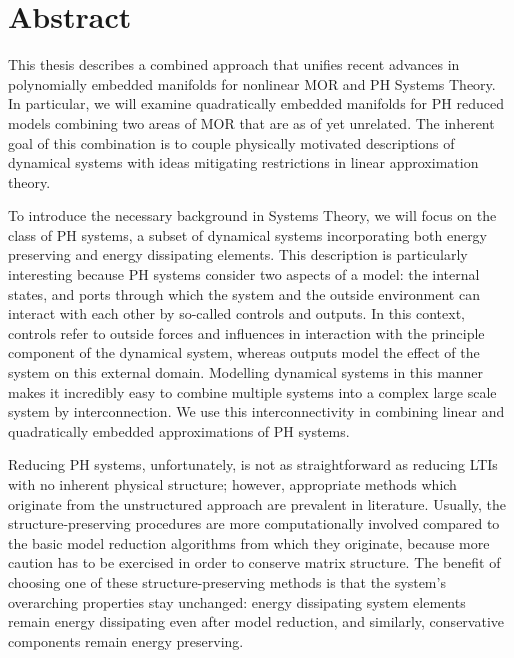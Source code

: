 \chapter*{Abstract}

This thesis describes a combined approach that unifies recent advances in polynomially embedded manifolds for nonlinear \acl{MOR} and \acl{PH} Systems Theory.
In particular, we will examine quadratically embedded manifolds for \acl{PH} reduced models combining two areas of \acl{MOR} that are as of yet unrelated.
The inherent goal of this combination is to couple physically motivated descriptions of dynamical systems with ideas mitigating restrictions in linear approximation theory.

To introduce the necessary background in Systems Theory, we will focus on the class of \acl{PH} systems, a subset of dynamical systems incorporating both energy preserving and energy dissipating elements.
This description is particularly interesting because \acl{PH} systems consider two aspects of a model: the internal states, and ports through which the system and the outside environment can interact with each other by so-called controls and outputs.
In this context, controls refer to outside forces and influences in interaction with the principle component of the dynamical system, whereas outputs model the effect of the system on this external domain.
Modelling dynamical systems in this manner makes it incredibly easy to combine multiple systems into a complex large scale system by interconnection.
We use this interconnectivity in combining linear and quadratically embedded approximations of \acl{PH} systems.

Reducing \acl{PH} systems, unfortunately, is not as straightforward as reducing \aclp{LTI} with no inherent physical structure; however, appropriate methods which originate from the unstructured approach are prevalent in literature.
Usually, the structure-preserving procedures are more computationally involved compared to the basic model reduction algorithms from which they originate, because more caution has to be exercised in order to conserve matrix structure.
The benefit of choosing one of these structure-preserving methods is that the system's overarching properties stay unchanged: energy dissipating system elements remain energy dissipating even after model reduction, and similarly, conservative components remain energy preserving.

